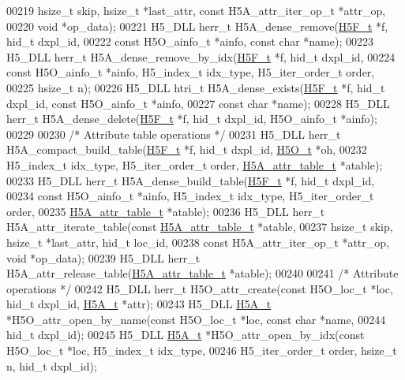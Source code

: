 \begin{DoxyCode}
00219     hsize\_t skip, hsize\_t *last\_attr, \textcolor{keyword}{const} H5A\_attr\_iter\_op\_t *attr\_op,
00220     \textcolor{keywordtype}{void} *op\_data);
00221 H5\_DLL herr\_t H5A\_dense\_remove(\hyperlink{struct_h5_f__t}{H5F\_t} *f, hid\_t dxpl\_id,
00222     \textcolor{keyword}{const} H5O\_ainfo\_t *ainfo, \textcolor{keyword}{const} \textcolor{keywordtype}{char} *name);
00223 H5\_DLL herr\_t H5A\_dense\_remove\_by\_idx(\hyperlink{struct_h5_f__t}{H5F\_t} *f, hid\_t dxpl\_id,
00224     \textcolor{keyword}{const} H5O\_ainfo\_t *ainfo, H5\_index\_t idx\_type, H5\_iter\_order\_t order,
00225     hsize\_t n);
00226 H5\_DLL htri\_t H5A\_dense\_exists(\hyperlink{struct_h5_f__t}{H5F\_t} *f, hid\_t dxpl\_id, \textcolor{keyword}{const} H5O\_ainfo\_t *ainfo,
00227     \textcolor{keyword}{const} \textcolor{keywordtype}{char} *name);
00228 H5\_DLL herr\_t H5A\_dense\_delete(\hyperlink{struct_h5_f__t}{H5F\_t} *f, hid\_t dxpl\_id, H5O\_ainfo\_t *ainfo);
00229 
00230 \textcolor{comment}{/* Attribute table operations */}
00231 H5\_DLL herr\_t H5A\_compact\_build\_table(\hyperlink{struct_h5_f__t}{H5F\_t} *f, hid\_t dxpl\_id, \hyperlink{struct_h5_o__t}{H5O\_t} *oh,
00232     H5\_index\_t idx\_type, H5\_iter\_order\_t order, \hyperlink{struct_h5_a__attr__table__t}{H5A\_attr\_table\_t} *atable);
00233 H5\_DLL herr\_t H5A\_dense\_build\_table(\hyperlink{struct_h5_f__t}{H5F\_t} *f, hid\_t dxpl\_id,
00234     \textcolor{keyword}{const} H5O\_ainfo\_t *ainfo, H5\_index\_t idx\_type, H5\_iter\_order\_t order,
00235     \hyperlink{struct_h5_a__attr__table__t}{H5A\_attr\_table\_t} *atable);
00236 H5\_DLL herr\_t H5A\_attr\_iterate\_table(\textcolor{keyword}{const} \hyperlink{struct_h5_a__attr__table__t}{H5A\_attr\_table\_t} *atable,
00237     hsize\_t skip, hsize\_t *last\_attr, hid\_t loc\_id,
00238     \textcolor{keyword}{const} H5A\_attr\_iter\_op\_t *attr\_op, \textcolor{keywordtype}{void} *op\_data);
00239 H5\_DLL herr\_t H5A\_attr\_release\_table(\hyperlink{struct_h5_a__attr__table__t}{H5A\_attr\_table\_t} *atable);
00240 
00241 \textcolor{comment}{/* Attribute operations */}
00242 H5\_DLL herr\_t H5O\_attr\_create(\textcolor{keyword}{const} H5O\_loc\_t *loc, hid\_t dxpl\_id, \hyperlink{struct_h5_a__t}{H5A\_t} *attr);
00243 H5\_DLL \hyperlink{struct_h5_a__t}{H5A\_t} *H5O\_attr\_open\_by\_name(\textcolor{keyword}{const} H5O\_loc\_t *loc, \textcolor{keyword}{const} \textcolor{keywordtype}{char} *name,
00244     hid\_t dxpl\_id);
00245 H5\_DLL \hyperlink{struct_h5_a__t}{H5A\_t} *H5O\_attr\_open\_by\_idx(\textcolor{keyword}{const} H5O\_loc\_t *loc, H5\_index\_t idx\_type,
00246     H5\_iter\_order\_t order, hsize\_t n, hid\_t dxpl\_id);

\end{DoxyCode}
